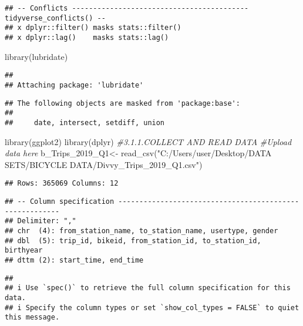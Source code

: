 \documentclass[
]{article}
\newenvironment{Shaded}{\begin{snugshade}}{\end{snugshade}}
\newcommand{\CommentTok}[1]{\textcolor[rgb]{0.56,0.35,0.01}{\textit{#1}}}
\newcommand{\FunctionTok}[1]{\textcolor[rgb]{0.00,0.00,0.00}{#1}}
\newcommand{\NormalTok}[1]{#1}
\newcommand{\OtherTok}[1]{\textcolor[rgb]{0.56,0.35,0.01}{#1}}
\newcommand{\StringTok}[1]{\textcolor[rgb]{0.31,0.60,0.02}{#1}}
\begin{document}
\begin{verbatim}
## -- Conflicts ------------------------------------------ tidyverse_conflicts() --
## x dplyr::filter() masks stats::filter()
## x dplyr::lag()    masks stats::lag()
\end{verbatim}

\begin{Shaded}
\begin{Highlighting}[]
\FunctionTok{library}\NormalTok{(lubridate)}
\end{Highlighting}
\end{Shaded}

\begin{verbatim}
## 
## Attaching package: 'lubridate'
\end{verbatim}

\begin{verbatim}
## The following objects are masked from 'package:base':
## 
##     date, intersect, setdiff, union
\end{verbatim}

\begin{Shaded}
\begin{Highlighting}[]
\FunctionTok{library}\NormalTok{(ggplot2)}
\FunctionTok{library}\NormalTok{(dplyr)}
\CommentTok{\#3.1.1.COLLECT  AND READ DATA}
\CommentTok{\#Upload data here}
\NormalTok{b\_Trips\_2019\_Q1}\OtherTok{\textless{}{-}} \FunctionTok{read\_csv}\NormalTok{(}\StringTok{"C:/Users/user/Desktop/DATA SETS/BICYCLE DATA/Divvy\_Trips\_2019\_Q1.csv"}\NormalTok{)}
\end{Highlighting}
\end{Shaded}

\begin{verbatim}
## Rows: 365069 Columns: 12
\end{verbatim}

\begin{verbatim}
## -- Column specification --------------------------------------------------------
## Delimiter: ","
## chr  (4): from_station_name, to_station_name, usertype, gender
## dbl  (5): trip_id, bikeid, from_station_id, to_station_id, birthyear
## dttm (2): start_time, end_time
\end{verbatim}

\begin{verbatim}
## 
## i Use `spec()` to retrieve the full column specification for this data.
## i Specify the column types or set `show_col_types = FALSE` to quiet this message.
\end{verbatim}
\end{document}
